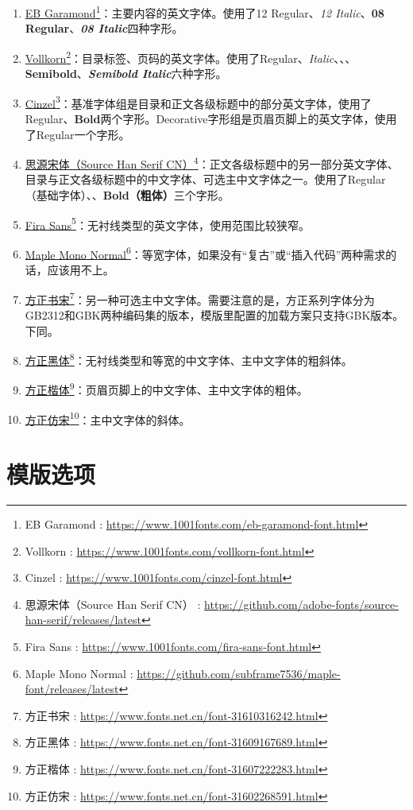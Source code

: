 \documentclass[10pt,openany]{book}
\newcommand{\link}[2]{\href{#1}{#2}\footnote{#2 : \href{#1}{#1}}}
\begin{document}
\begin{enumerate}
    \item \link{https://www.1001fonts.com/eb-garamond-font.html}{EB Garamond}：主要内容的英文字体。使用了12 Regular、\textit{12 Italic}、\textbf{08 Regular}、\textbf{\textit{08 Italic}}四种字形。
    \item \link{https://www.1001fonts.com/vollkorn-font.html}{Vollkorn}：目录标签、页码的英文字体。使用了Regular、\textit{Italic}、、、\textbf{Semibold}、\textbf{\textit{Semibold Italic}}六种字形。\titlefont\scshape
    \item \link{https://www.1001fonts.com/cinzel-font.html}{Cinzel}：基准字体组是目录和正文各级标题中的部分英文字体，使用了Regular、\textbf{Bold}两个字形。\upshape\infofont Decorative字形组是页眉页脚上的英文字体，使用了Regular一个字形。\titlefont
    \item \link{https://github.com/adobe-fonts/source-han-serif/releases/latest}{思源宋体（Source Han Serif CN）}：正文各级标题中的另一部分英文字体、目录与正文各级标题中的中文字体、可选主中文字体之一。使用了Regular（基础字体）、、\textbf{Bold（粗体）}三个字形。\sffamily
    \item \link{https://www.1001fonts.com/fira-sans-font.html}{Fira Sans}：无衬线类型的英文字体，使用范围比较狭窄。\ttfamily
    \item \link{https://github.com/subframe7536/maple-font/releases/latest}{Maple Mono Normal}：等宽字体，如果没有“复古”或“插入代码”两种需求的话，应该用不上。\rmfamily\shusong
    \item \link{https://www.fonts.net.cn/font-31610316242.html}{方正书宋}：另一种可选主中文字体。需要注意的是，方正系列字体分为GB2312和GBK两种编码集的版本，模版里配置的加载方案只支持GBK版本。下同。\sffamily
    \item \link{https://www.fonts.net.cn/font-31609167689.html}{方正黑体}：无衬线类型和等宽的中文字体、主中文字体的粗斜体。\infofont
    \item \link{https://www.fonts.net.cn/font-31607222283.html}{方正楷体}：页眉页脚上的中文字体、主中文字体的粗体。\rmfamily\itshape
    \item \link{https://www.fonts.net.cn/font-31602268591.html}{方正仿宋}：主中文字体的斜体。\upshape
\end{enumerate}

\chapter{模版选项}
\end{document}
